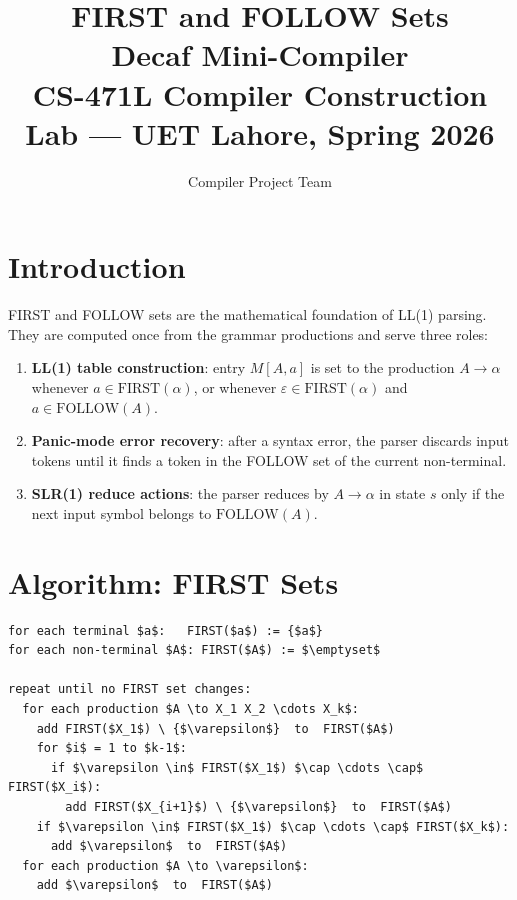 \documentclass[12pt,a4paper]{article}
\title{\textbf{FIRST and FOLLOW Sets}\\
       \large Decaf Mini-Compiler\\
       CS-471L Compiler Construction Lab --- UET Lahore, Spring 2026}
\author{Compiler Project Team}
\date{}
\begin{document}
\maketitle
\tableofcontents
\newpage

\section{Introduction}

FIRST and FOLLOW sets are the mathematical foundation of LL(1) parsing.
They are computed once from the grammar productions and serve three roles:

\begin{enumerate}
  \item \textbf{LL(1) table construction}: entry $M[A, a]$ is set to the
        production $A \to \alpha$ whenever $a \in \text{FIRST}(\alpha)$,
        or whenever $\varepsilon \in \text{FIRST}(\alpha)$ and
        $a \in \text{FOLLOW}(A)$.
  \item \textbf{Panic-mode error recovery}: after a syntax error, the parser
        discards input tokens until it finds a token in the FOLLOW set of the
        current non-terminal.
  \item \textbf{SLR(1) reduce actions}: the parser reduces by $A \to \alpha$
        in state $s$ only if the next input symbol belongs to $\text{FOLLOW}(A)$.
\end{enumerate}

\section{Algorithm: FIRST Sets}

\begin{lstlisting}[style=pseudo]
for each terminal $a$:   FIRST($a$) := {$a$}
for each non-terminal $A$: FIRST($A$) := $\emptyset$

repeat until no FIRST set changes:
  for each production $A \to X_1 X_2 \cdots X_k$:
    add FIRST($X_1$) \ {$\varepsilon$}  to  FIRST($A$)
    for $i$ = 1 to $k-1$:
      if $\varepsilon \in$ FIRST($X_1$) $\cap \cdots \cap$ FIRST($X_i$):
        add FIRST($X_{i+1}$) \ {$\varepsilon$}  to  FIRST($A$)
    if $\varepsilon \in$ FIRST($X_1$) $\cap \cdots \cap$ FIRST($X_k$):
      add $\varepsilon$  to  FIRST($A$)
  for each production $A \to \varepsilon$:
    add $\varepsilon$  to  FIRST($A$)
\end{lstlisting}
\end{document}
